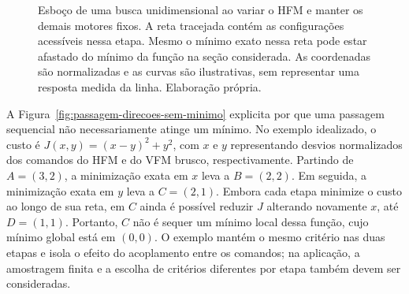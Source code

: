 \documentclass[12pt,a4paper]{article}
\begin{document}
\begin{figure}[htbp]
    \centering
    \caption{Esboço de uma busca unidimensional ao variar o HFM e manter os demais motores fixos. A reta tracejada contém as configurações acessíveis nessa etapa. Mesmo o mínimo exato nessa reta pode estar afastado do mínimo da função na seção considerada. As coordenadas são normalizadas e as curvas são ilustrativas, sem representar uma resposta medida da linha. Elaboração própria.}
    \label{fig:busca-direcao-hfm}
\end{figure}

A Figura~\ref{fig:passagem-direcoes-sem-minimo} explicita por que uma passagem sequencial não necessariamente atinge um mínimo. No exemplo idealizado, o custo é $J(x,y)=(x-y)^2+y^2$, com $x$ e $y$ representando desvios normalizados dos comandos do HFM e do VFM brusco, respectivamente. Partindo de $A=(3,2)$, a minimização exata em $x$ leva a $B=(2,2)$. Em seguida, a minimização exata em $y$ leva a $C=(2,1)$. Embora cada etapa minimize o custo ao longo de sua reta, em $C$ ainda é possível reduzir $J$ alterando novamente $x$, até $D=(1,1)$. Portanto, $C$ não é sequer um mínimo local dessa função, cujo mínimo global está em $(0,0)$. O exemplo mantém o mesmo critério nas duas etapas e isola o efeito do acoplamento entre os comandos; na aplicação, a amostragem finita e a escolha de critérios diferentes por etapa também devem ser consideradas.
\end{document}
